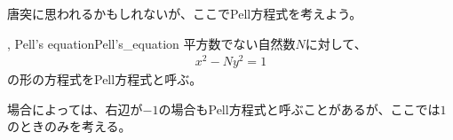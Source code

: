 唐突に思われるかもしれないが、ここでPell方程式を考えよう。

\begin{Defi}{, Pell's equation}{Pell's_equation}
平方数でない自然数$N$に対して、
\begin{align*}
x^2 - Ny^2 = 1
\end{align*}
の形の方程式をPell方程式と呼ぶ。
\end{Defi}
場合によっては、右辺が$-1$の場合もPell方程式と呼ぶことがあるが、ここでは$1$のときのみを考える。


